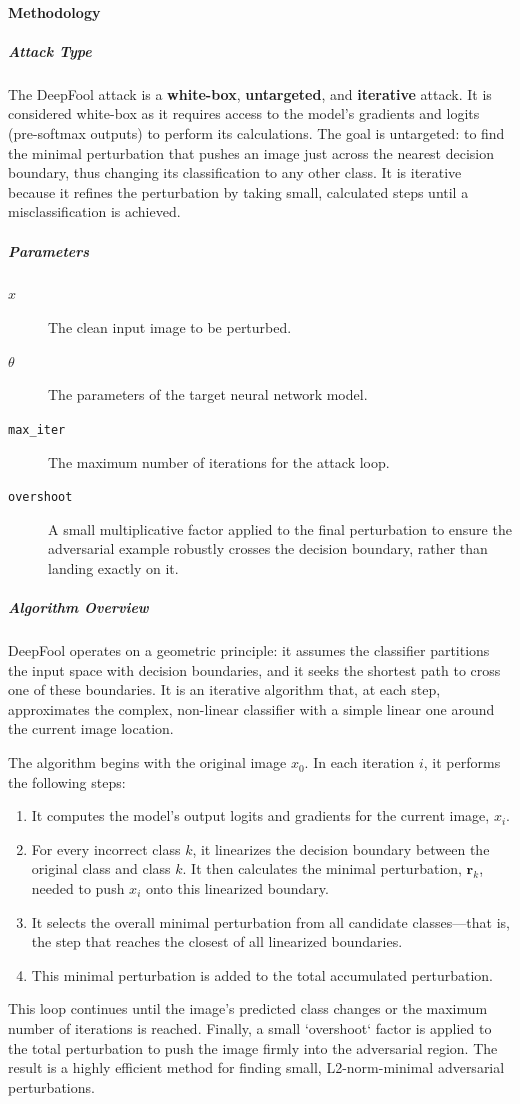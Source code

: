 \documentclass[../main.tex]{subfiles}
\begin{document}
\paragraph{Methodology}

\subparagraph{Attack Type}
The DeepFool attack is a \textbf{white-box}, \textbf{untargeted}, and \textbf{iterative} attack. It is considered white-box as it requires access to the model's gradients and logits (pre-softmax outputs) to perform its calculations. The goal is untargeted: to find the minimal perturbation that pushes an image just across the nearest decision boundary, thus changing its classification to any other class. It is iterative because it refines the perturbation by taking small, calculated steps until a misclassification is achieved.

\subparagraph{Parameters}
\begin{description}
  \item[$x$] The clean input image to be perturbed.
  \item[$\theta$] The parameters of the target neural network model.
  \item[\texttt{max\_iter}] The maximum number of iterations for the attack loop.
  \item[\texttt{overshoot}] A small multiplicative factor applied to the final perturbation to ensure the adversarial example robustly crosses the decision boundary, rather than landing exactly on it.
\end{description}

\subparagraph{Algorithm Overview}
DeepFool operates on a geometric principle: it assumes the classifier partitions the input space with decision boundaries, and it seeks the shortest path to cross one of these boundaries. It is an iterative algorithm that, at each step, approximates the complex, non-linear classifier with a simple linear one around the current image location.

The algorithm begins with the original image $x_0$. In each iteration $i$, it performs the following steps:
\begin{enumerate}
    \item It computes the model's output logits and gradients for the current image, $x_i$.
    \item For every incorrect class $k$, it linearizes the decision boundary between the original class and class $k$. It then calculates the minimal perturbation, $\mathbf{r}_k$, needed to push $x_i$ onto this linearized boundary.
    \item It selects the overall minimal perturbation from all candidate classes—that is, the step that reaches the closest of all linearized boundaries.
    \item This minimal perturbation is added to the total accumulated perturbation.
\end{enumerate}
This loop continues until the image's predicted class changes or the maximum number of iterations is reached. Finally, a small `overshoot` factor is applied to the total perturbation to push the image firmly into the adversarial region. The result is a highly efficient method for finding small, L2-norm-minimal adversarial perturbations.
\end{document}
